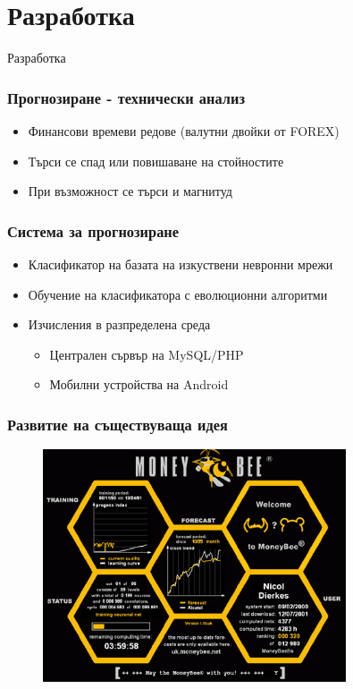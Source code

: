 \documentclass{beamer}
\begin{document}
\section{Разработка}

\begin{frame}
\center \huge{Разработка}
\end{frame}

\begin{frame}
\frametitle{Прогнозиране - технически анализ}
\begin{itemize}
	\item Финансови времеви редове (валутни двойки от FOREX)
	\item Търси се спад или повишаване на стойностите
	\item При възможност се търси и магнитуд
\end{itemize}
\end{frame}

\begin{frame}
\frametitle{Система за прогнозиране}
\begin{itemize}
	\item Класификатор на базата на изкуствени невронни мрежи
	\item Обучение на класификатора с еволюционни алгоритми
	\item Изчисления в разпределена среда
	\begin{itemize}
		\item Централен сървър на MySQL/PHP
		\item Мобилни устройства на Android
	\end{itemize}
\end{itemize}
\end{frame}

\begin{frame}
\frametitle{Развитие на съществуваща идея}
\begin{figure}[h]
  \centering
  \includegraphics[width=0.8\textwidth]{Moneyb2.png}
\end{figure}
\end{frame}
\end{document}
